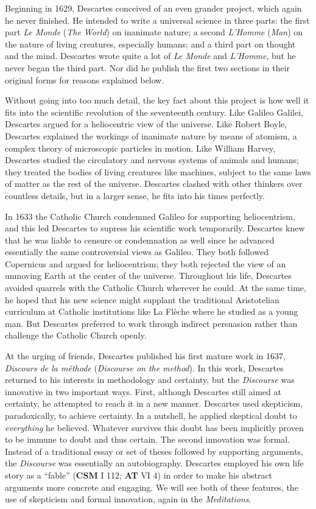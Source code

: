 Beginning in 1629, Descartes conceived of an even grander project, which again he never finished. He intended to write a universal science in three parts: the first part \textit{Le Monde} (\textit{The World}) on inanimate nature; a second \textit{L'Homme} (\textit{Man}) on the nature of living creatures, especially humans; and a third part on thought and the mind. Descartes wrote quite a lot of \textit{Le Monde} and \textit{L'Homme}, but he never began the third part. Nor did he publish the first two sections in their original forms for reasons explained below.

Without going into too much detail, the key fact about this project is how well it fits into the scientific revolution of the seventeenth century. Like Galileo Galilei, Descartes argued for a heliocentric view of the universe. Like Robert Boyle, Descartes explained the workings of inanimate nature by means of atomism, a complex theory of microscopic particles in motion. Like William Harvey, Descartes studied the circulatory and nervous systems of animals and humans; they treated the bodies of living creatures like machines, subject to the same laws of matter as the rest of the universe. Descartes clashed with other thinkers over countless details, but in a larger sense, he fits into his times perfectly.

In 1633 the Catholic Church condemned Galileo for supporting heliocentrism, and this led Descartes to supress his scientific work temporarily. Descartes knew that he was liable to censure or condemnation as well since he advanced essentially the same controversial views as Galileo. They both followed Copernicus and argued for heliocentrism; they both rejected the view of an unmoving Earth at the center of the universe. Throughout his life, Descartes avoided quarrels with the Catholic Church wherever he could. At the same time, he hoped that his new science might supplant the traditional Aristotelian curriculum at Catholic institutions like La Flèche where he studied as a young man. But Descartes preferred to work through indirect persuasion rather than challenge the Catholic Church openly.

At the urging of friends, Descartes published his first mature work in 1637, \textit{Discours de la méthode} (\textit{Discourse on the method}). In this work, Descartes returned to his interests in methodology and certainty, but the \textit{Discourse} was innovative in two important ways. First, although Descartes still aimed at certainty, he attempted to reach it in a new manner. Descartes used skepticism, paradoxically, to achieve certainty. In a nutshell, he applied skeptical doubt to \textit{everything} he believed. Whatever survives this doubt has been implicitly proven to be immune to doubt and thus certain. The second innovation was formal. Instead of a traditional essay or set of theses followed by supporting arguments, the \textit{Discourse} was essentially an autobiography. Descartes employed his own life story as a ``fable'' (\textbf{CSM} I 112; \textbf{AT} VI 4) in order to make his abstract arguments more concrete and engaging. We will see both of these features, the use of skepticism and formal innovation, again in the \textit{Meditations}.

